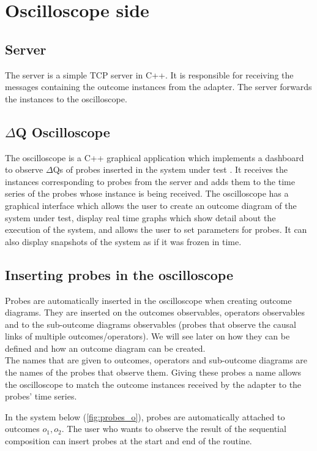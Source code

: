 \section{Oscilloscope side}
    \subsection{Server} The server is a simple TCP server in C++. It is responsible for receiving the messages containing the outcome instances from the adapter. The server forwards the instances to the oscilloscope.
    
    \subsection{$\Delta$Q Oscilloscope} The oscilloscope is a C++ graphical application which implements a dashboard to observe $\Delta$Qs of probes inserted in the system under test \cite{osc-g}. It receives the instances corresponding to probes from the server and adds them to the time series of the probes whose instance is being received. 
    The oscilloscope has a graphical interface which allows the user to create an outcome diagram of the system under test, display real time graphs which show detail about the execution of the system, and allows the user to set parameters for probes. It can also display snapshots of the system as if it was frozen in time.

    \subsection{Inserting probes in the oscilloscope}
        Probes are automatically inserted in the oscilloscope when creating outcome diagrams. They are inserted on the outcomes observables, operators observables and to the sub-outcome diagrams observables (probes that observe the causal links of multiple outcomes/operators). We will see later on how they can be defined and how an outcome diagram can be created. \\
    The names that are given to outcomes, operators and sub-outcome diagrams are the names of the probes that observe them. Giving these probes a name allows the oscilloscope to match the outcome instances received by the adapter to the probes' time series.

        In the system below (\cref{fig:probes_o}), probes are automatically attached to outcomes $o_1, o_2$. The user who wants to observe the result of the sequential composition can insert probes at the start and end of the routine. 
    
